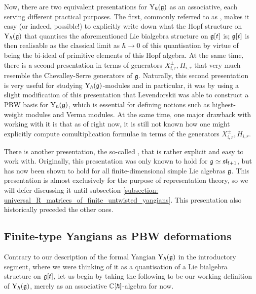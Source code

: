     Now, there are two equivalent presentations for $\mathrm{Y}_{\hbar}(\mathfrak{g})$ as an associative, each serving different practical purposes. The first, commonly referred to as , makes it easy (or indeed, possible!) to explicitly write down what the Hopf structure on $\mathrm{Y}_{\hbar}(\mathfrak{g})$ that quantises the aforementioned Lie bialgebra structure on $\mathfrak{g}[t]$ is; $\mathfrak{g}[t]$ is then realisable as the classical limit as $\hbar \to 0$ of this quantisation by virtue of being the bi-ideal of primitive elements of this Hopf algebra. At the same time, there is a second presentation in terms of generators $X_{i, r}^{\pm}, H_{i, r}$ that very much resemble the Chevalley-Serre generators of $\mathfrak{g}$. Naturally, this second presentation is very useful for studying $\mathrm{Y}_{\hbar}(\mathfrak{g})$-modules and in particular, it was by using a slight modification of this presentation that Levendorskii was able to construct a PBW basis for $\mathrm{Y}_{\hbar}(\mathfrak{g})$, which is essential for defining notions such as highest-weight modules and Verma modules. At the same time, one major drawback with working with it is that as of right now, it is still not known how one might explicitly compute comultiplication formulae in terms of the generators $X_{i, r}^{\pm}, H_{i, r}$. 

    There is another presentation, the so-called , that is rather explicit and easy to work with. Originally, this presentation was only known to hold for $\mathfrak{g} \simeq \mathfrak{sl}_{l + 1}$, but has now been shown to hold for all finite-dimensional simple Lie algebras $\mathfrak{g}$. This presentation is almost exclusively for the purpose of representation theory, so we will defer discussing it until subsection \ref{subsection: universal_R_matrices_of_finite_untwisted_yangians}. This presentation also historically preceded the other ones.

    \subsection{Finite-type Yangians as PBW deformations}
        Contrary to our description of the formal Yangian $\mathrm{Y}_{\hbar}(\mathfrak{g})$ in the introductory segment, where we were thinking of it as a quantisation of a Lie bialgebra structure on $\mathfrak{g}[t]$, let us begin by taking the following to be our working definition of $\mathrm{Y}_{\hbar}(\mathfrak{g})$, merely as an associative $\mathbb{C}[\hbar]$-algebra for now.

